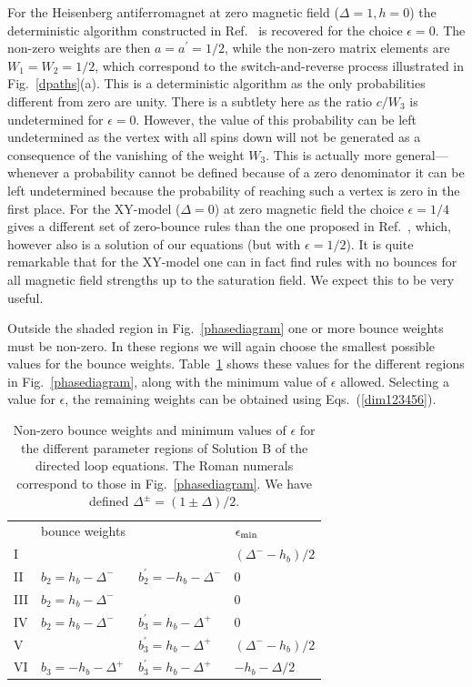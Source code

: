 \documentclass[10pt,pre,aps,twocolumn,showpacs,superscriptaddress,
floatfix]{revtex4}
\begin{document}
For the Heisenberg antiferromagnet at zero magnetic field ($\Delta=1,h=0$)
the deterministic algorithm constructed in Ref.~ is
recovered for the choice $\epsilon = 0$. The non-zero weights are then
$a=a^\prime=1/2$, while the non-zero matrix elements are $W_1 = W_2 = 1/2$,
which correspond to the switch-and-reverse process illustrated in 
Fig.~\ref{dpaths}(a). This is a deterministic algorithm as the only 
probabilities different from zero are unity.  There is a subtlety 
here as the ratio $c/W_3$ is undetermined for $\epsilon=0$. However, the 
value of this probability can be left undetermined as the vertex with all 
spins down will not be generated as a consequence of the vanishing of the 
weight $W_3$. This is actually more general---whenever a probability cannot 
be defined because of a zero denominator it can be left undetermined 
because the probability of reaching such a vertex is zero in the 
first place. For the XY-model ($\Delta=0$) at zero magnetic field the choice 
$\epsilon=1/4$ gives a different set of zero-bounce rules than the one 
proposed in Ref.~, which, however also is a solution of our 
equations (but with $\epsilon=1/2$). It is quite remarkable that for the 
XY-model one can in fact find rules with no bounces for all magnetic field 
strengths up to the saturation field. We expect this to be very useful. 

Outside the shaded region in Fig.~\ref{phasediagram} one or more bounce 
weights must be non-zero. In these regions we will again choose the smallest 
possible values for the bounce weights. Table~\ref{bounceweights} shows 
these values for the different regions in Fig.~\ref{phasediagram}, along with
the minimum value of $\epsilon$ allowed. Selecting a value for $\epsilon$, 
the remaining weights can be obtained using 
Eqs.~(\ref{dim123456}).

\begin{table}
\caption{\label{bounceweights}
Non-zero bounce weights and minimum values of $\epsilon$ for the 
different parameter regions of Solution B of the directed loop equations.
The Roman numerals correspond to those in Fig.~\ref{phasediagram}. We 
have defined $\Delta^\pm = (1 \pm \Delta)/2$.}
\begin{ruledtabular}
\begin{tabular}{llll}
         & bounce weights       &        & $\epsilon_{\rm min}$\\
\rm{I}  &                      &                   & $ (\Delta^--h_b)/2 $ \\
\rm{II} & $b_2 = h_b -\Delta^-$ &$b^\prime_2=-h_b -\Delta^- $ &$0$\\
\rm{III}& $b_2=h_b -\Delta^-$   &                            &$0$\\
\rm{IV} & $b_2=h_b -\Delta^-$   &$b^\prime_3=h_b -\Delta^+$&$0$\\
\rm{V} &                        &$b^\prime_3=h_b -\Delta^+$ &$ (\Delta^--h_b)/2 $ \\
\rm{VI}& $b_3=-h_b-\Delta^+$   &$b^\prime_3=h_b-\Delta^+$ &$-h_b-\Delta/2$\\
\end{tabular}
\end{ruledtabular}
\end{table}
\end{document}
